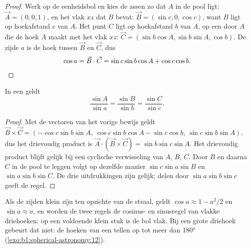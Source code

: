\begin{proof}
Werk op de eenheidsbol en kies de assen zo dat $A$ in de pool ligt:
$\vec A = (0, 0, 1)$, en het vlak $xz$ dat $B$ bevat:
$\vec B = (\sin c, 0, \cos c)$, want $B$ ligt op hoekafstand $c$ van
$A$. Het punt $C$ ligt op hoekafstand $b$ van $A$, op een 
door $A$ die de hoek $A$ maakt met het vlak $xz$:
$\vec C = (\sin b\cos A, \sin b\sin A, \cos b)$. De zijde $a$ is de hoek tussen
$\vec B$ en $\vec C$, dus
\[
  \cos a = \vec B\cdot\vec C = \sin c\sin b\cos A + \cos c\cos b. \qedhere
\]
\end{proof}

\begin{theorem}[De sinusregel]\label{thm:b1:spherical-astronomy:sine-rule}
In een  geldt
\[
  \frac{\sin A}{\sin a} = \frac{\sin B}{\sin b} = \frac{\sin C}{\sin c}.
\]
\end{theorem}

\begin{proof}
Met de vectoren van het vorige bewijs geldt
$\vec B \times \vec C = (-\cos c\sin b\sin A,\ \cos c\sin b\cos A - \sin c\cos b,\
\sin c\sin b\sin A)$, dus het drievoudig product is
$\vec A\cdot(\vec B\times\vec C) = \sin b\sin c\sin A$. Het drievoudig product
blijft gelijk bij een cyclische verwisseling van $A$, $B$, $C$. Door $B$ en
daarna $C$ in de pool te leggen volgt op dezelfde manier $\sin c\sin a\sin B$ en
$\sin a\sin b\sin
C$. De drie uitdrukkingen zijn gelijk; delen door
$\sin a\sin b\sin c$ geeft de regel.
\end{proof}

Als de zijden klein zijn ten opzichte van de straal, geldt $\cos a \approx 1 -
a^2/2$ en $\sin a \approx a$, en worden de twee regels de cosinus- en
sinusregel van vlakke driehoeken: op een voldoende klein stuk is de bol vlak.
Bij een grote driehoek gebeurt dat niet: de hoeken van een
 tellen op tot meer dan \ang{180}
(\cref{exo:b1:spherical-astronomy:12}).

